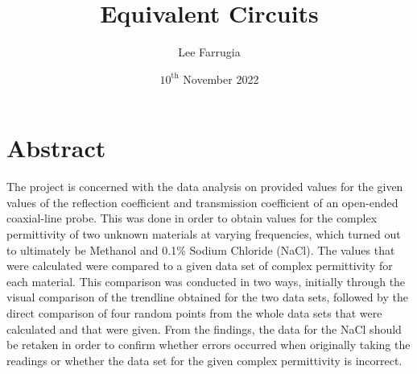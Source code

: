 \documentclass[12pt, a4paper]{article}
\title{Equivalent Circuits}
\date{\(10^\mathrm{{th}}\) November 2022}
\author{Lee Farrugia}
\begin{document}
    
\maketitle
\thispagestyle{titlepagestyle}
\pagestyle{mystyle}

\section{Abstract}
The project is concerned with the data analysis on provided values for the given values of the reflection coefficient and transmission coefficient of an open-ended coaxial-line probe. This was done in order to obtain values for the complex permittivity of two unknown materials at varying frequencies, which turned out to ultimately be Methanol and 0.1\% Sodium Chloride (NaCl). The values that were calculated were compared to a given data set of complex permittivity for each material. This comparison was conducted in two ways, initially through the visual comparison of the trendline obtained for the two data sets, followed by the direct comparison of four random points from the whole data sets that were calculated and that were given. From the findings, the data for the NaCl should be retaken in order to confirm whether errors occurred when originally taking the readings or whether the data set for the given complex permittivity is incorrect.
\end{document}

